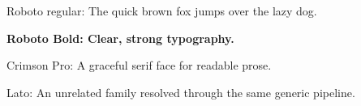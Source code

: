 \documentclass{article}
\begin{document}
Roboto regular: The quick brown fox jumps over the lazy dog.

\textbf{Roboto Bold: Clear, strong typography.}

{\crimson Crimson Pro: A graceful serif face for readable prose.}

{\lato Lato: An unrelated family resolved through the same generic pipeline.}
\end{document}
